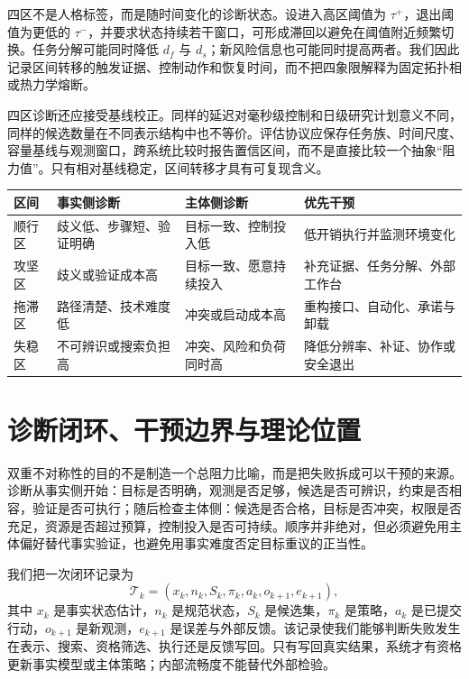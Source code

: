 四区不是人格标签，而是随时间变化的诊断状态。设进入高区阈值为 $\tau^+$，退出阈值为更低的 $\tau^-$，并要求状态持续若干窗口，可形成滞回以避免在阈值附近频繁切换。任务分解可能同时降低 $d_f$ 与 $d_s$；新风险信息也可能同时提高两者。我们因此记录区间转移的触发证据、控制动作和恢复时间，而不把四象限解释为固定拓扑相或热力学熔断。

四区诊断还应接受基线校正。同样的延迟对毫秒级控制和日级研究计划意义不同，同样的候选数量在不同表示结构中也不等价。评估协议应保存任务族、时间尺度、容量基线与观测窗口，跨系统比较时报告置信区间，而不是直接比较一个抽象“阻力值”。只有相对基线稳定，区间转移才具有可复现含义。

\begin{table}[htbp]
\centering
\begin{tabularx}{\textwidth}{l X X X}
\toprule
\rowcolor{structurecolor!20} 区间 & 事实侧诊断 & 主体侧诊断 & 优先干预 \\
\midrule
顺行区 & 歧义低、步骤短、验证明确 & 目标一致、控制投入低 & 低开销执行并监测环境变化 \\
攻坚区 & 歧义或验证成本高 & 目标一致、愿意持续投入 & 补充证据、任务分解、外部工作台 \\
拖滞区 & 路径清楚、技术难度低 & 冲突或启动成本高 & 重构接口、自动化、承诺与卸载 \\
失稳区 & 不可辨识或搜索负担高 & 冲突、风险和负荷同时高 & 降低分辨率、补证、协作或安全退出 \\
\bottomrule
\end{tabularx}
\end{table}

\section{诊断闭环、干预边界与理论位置}
\label{sec:section_6127}

双重不对称性的目的不是制造一个总阻力比喻，而是把失败拆成可以干预的来源。诊断从事实侧开始：目标是否明确，观测是否足够，候选是否可辨识，约束是否相容，验证是否可执行；随后检查主体侧：候选是否合格，目标是否冲突，权限是否充足，资源是否超过预算，控制投入是否可持续。顺序并非绝对，但必须避免用主体偏好替代事实验证，也避免用事实难度否定目标重议的正当性。

我们把一次闭环记录为
\begin{equation}
\mathcal{T}_k=(x_k,n_k,S_k,\pi_k,a_k,o_{k+1},e_{k+1}),
\end{equation}
其中 $x_k$ 是事实状态估计，$n_k$ 是规范状态，$S_k$ 是候选集，$\pi_k$ 是策略，$a_k$ 是已提交行动，$o_{k+1}$ 是新观测，$e_{k+1}$ 是误差与外部反馈。该记录使我们能够判断失败发生在表示、搜索、资格筛选、执行还是反馈写回。只有写回真实结果，系统才有资格更新事实模型或主体策略；内部流畅度不能替代外部检验。

